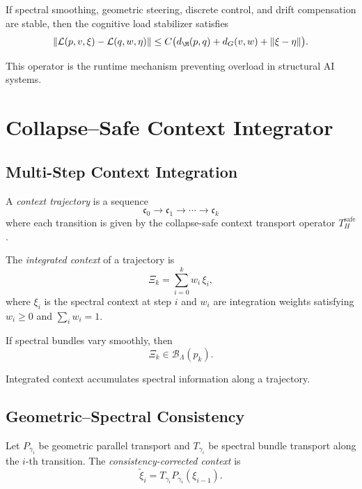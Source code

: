 \begin{theorem}
If spectral smoothing, geometric steering, discrete control, and drift
compensation are stable, then the cognitive load stabilizer satisfies
\[
\| \mathcal{L}(p,v,\xi) - \mathcal{L}(q,w,\eta) \|
\le C \big( d_\M(p,q) + d_G(v,w) + \|\xi - \eta\| \big).
\]
\end{theorem}

\begin{remark}
This operator is the runtime mechanism preventing overload in structural
AI systems.
\end{remark}


\section{Collapse--Safe Context Integrator}

\subsection{Multi-Step Context Integration}

\begin{definition}
A \emph{context trajectory} is a sequence
\[
\mathfrak{c}_0 \to \mathfrak{c}_1 \to \cdots \to \mathfrak{c}_k
\]
where each transition is given by the collapse-safe context transport
operator $T_H^\mathrm{safe}$.
\end{definition}

\begin{definition}
The \emph{integrated context} of a trajectory is
\[
\Xi_k = \sum_{i=0}^k w_i\, \xi_i,
\]
where $\xi_i$ is the spectral context at step $i$ and $w_i$ are integration
weights satisfying $w_i \ge 0$ and $\sum_i w_i = 1$.
\end{definition}

\begin{lemma}
If spectral bundles vary smoothly, then
\[
\Xi_k \in \mathcal{B}_\Lambda(p_k).
\]
\end{lemma}

\begin{remark}
Integrated context accumulates spectral information along a trajectory.
\end{remark}

\subsection{Geometric--Spectral Consistency}

\begin{definition}
Let $P_{\gamma_i}$ be geometric parallel transport and $T_{\gamma_i}$ be
spectral bundle transport along the $i$-th transition.  
The \emph{consistency-corrected context} is
\[
\tilde{\xi}_i
= T_{\gamma_i} P_{\gamma_i}(\xi_{i-1}).
\]
\end{definition}

